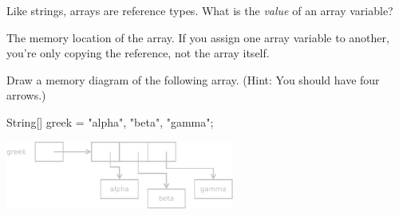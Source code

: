 \Q Like strings, arrays are reference types. What is the \emph{value} of an array variable?

\begin{answer}
The memory location of the array. If you assign one array variable to another, you're only copying the reference, not the array itself.
\end{answer}


\Q Draw a memory diagram of the following array.
(Hint: You should have four arrows.)

\begin{javalst}
String[] greek = {"alpha", "beta", "gamma"};
\end{javalst}

\begin{answer}[5em]
\hspace{4em}
\includegraphics[height=6em]{string-array.pdf}
\end{answer}
